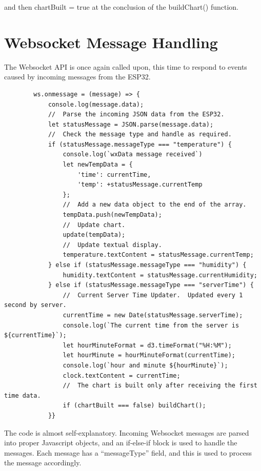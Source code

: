 \documentclass[oneside,letterpaper,12pt]{book}
\begin{document}
and then chartBuilt = true at the conclusion of the buildChart()
function.

\section{Websocket Message Handling}\label{websocket-message-handling}

The Websocket API is once again called upon, this time to respond to
events caused by incoming messages from the ESP32.

\begin{verbatim}
        ws.onmessage = (message) => {
            console.log(message.data);
            //  Parse the incoming JSON data from the ESP32.
            let statusMessage = JSON.parse(message.data);
            //  Check the message type and handle as required.
            if (statusMessage.messageType === "temperature") {
                console.log(`wxData message received`)
                let newTempData = {
                    'time': currentTime,
                    'temp': +statusMessage.currentTemp
                };
                //  Add a new data object to the end of the array.
                tempData.push(newTempData);
                //  Update chart.
                update(tempData);
                //  Update textual display.
                temperature.textContent = statusMessage.currentTemp;
            } else if (statusMessage.messageType === "humidity") {
                humidity.textContent = statusMessage.currentHumidity;
            } else if (statusMessage.messageType === "serverTime") {
                //  Current Server Time Updater.  Updated every 1 second by server.
                currentTime = new Date(statusMessage.serverTime);
                console.log(`The current time from the server is ${currentTime}`);
                let hourMinuteFormat = d3.timeFormat("%H:%M");
                let hourMinute = hourMinuteFormat(currentTime);
                console.log(`hour and minute ${hourMinute}`);
                clock.textContent = currentTime;
                //  The chart is built only after receiving the first time data.
                if (chartBuilt === false) buildChart();
            }}
\end{verbatim}

The code is almost self-explanatory. Incoming Websocket messages are
parsed into proper Javascript objects, and an if-else-if block is used
to handle the messages. Each message has a ``messageType'' field, and
this is used to process the message accordingly.
\end{document}
